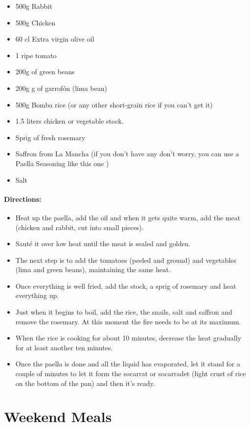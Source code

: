 \documentclass{article}
\begin{document}
\begin{itemize}
	\item 500g Rabbit
	\item 500g Chicken
	\item 60 cl Extra virgin olive oil
	\item 1 ripe tomato
	\item 200g of green beans
	\item 200g g of garrofón (lima bean)
	\item 500g Bomba rice (or any other short-grain rice if you can’t get it)
	\item 1.5 liters chicken or vegetable stock.
	\item Sprig of fresh rosemary
	\item Saffron from La Mancha (if you don’t have any don’t worry, you can use a Paella Seasoning like this one )
	\item Salt
\end{itemize}

\paragraph{Directions:}
\begin{itemize}
	\item Heat up the paella, add the oil and when it gets quite warm, add the meat (chicken and rabbit, cut into small pieces).
	\item Sauté it over low heat until the meat is sealed and golden.
	\item The next step is to add the tomatoes (peeled and ground) and vegetables (lima and green beans), maintaining the same heat.
	\item Once everything is well fried, add the stock, a sprig of rosemary and heat everything up.
	\item Just when it begins to boil, add the rice, the snails, salt and saffron and remove the rosemary. At this moment the fire needs to be at its maximum.
	\item When the rice is cooking for about 10 minutes, decrease the heat gradually for at least another ten minutes.
	\item Once the paella is done and all the liquid has evaporated, let it stand for a couple of minutes to let it form the socarrat or socarradet (light crust of rice on the bottom of the pan) and then it’s ready.
\end{itemize}

\section{Weekend Meals}
\end{document}
